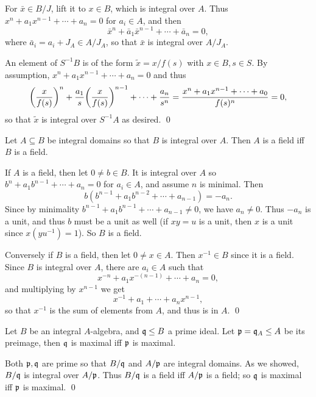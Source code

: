 \eprop

\bproof

    For $\bar x\in B/J$, lift it to $x\in B$, which is integral over $A$.
    Thus $x^n+a_1x^{n-1}+\cdots+a_n=0$ for $a_i\in A$, and then
    $$ \bar x^n + \bar a_1\bar x^{n-1} + \cdots + \bar a_n = 0 , $$
    where $\bar a_i=a_i+J_A\in A/J_A$, so that $\bar x$ is integral over $A/J_A$.

    An element of $S^{-1}B$ is of the form $\tilde x=x/f(s)$ with $x\in B,s\in S$.
    By assumption, $x^n+a_1x^{n-1}+\cdots+a_n=0$ and thus
    $$ \mathopen{}\mathclose{\left({{x}\over{f(s)}}\right)}^n + {{a_1}\over{s}}\mathopen{}\mathclose{\left({{x}\over{f(s)}}\right)}^{n-1} + \cdots + {{a_n}\over{s^n}} = {{x^n+a_1x^{n-1}+\cdots+a_0}\over{f(s)^n}} = 0 , $$
    so that $\tilde x$ is integral over $S^{-1}A$ as desired.
    \qed

\eproof

\bprop

    Let $A\subseteq B$ be integral domains so that $B$ is integral over $A$.
    Then $A$ is a field iff $B$ is a field.

\eprop

\bproof

    If $A$ is a field, then let $0\neq b\in B$.
    It is integral over $A$ so $b^n+a_1b^{n-1}+\cdots+a_n=0$ for $a_i\in A$, and assume $n$ is minimal.
    Then
    $$ b(b^{n-1} + a_1b^{n-2} + \cdots + a_{n-1}) = -a_n . $$
    Since by minimality $b^{n-1}+a_1b^{n-1}+\cdots+a_{n-1}\neq0$, we have $a_n\neq0$.
    Thus $-a_n$ is a unit, and thus $b$ must be a unit as well (if $xy=u$ is a unit, then $x$ is a unit since $x(yu^{-1})=1$).
    So $B$ is a field.

    Conversely if $B$ is a field, then let $0\neq x\in A$.
    Then $x^{-1}\in B$ since it is a field.
    Since $B$ is integral over $A$, there are $a_i\in A$ such that
    $$ x^{-n} + a_1x^{-(n-1)} + \cdots + a_n = 0 , $$
    and multiplying by $x^{n-1}$ we get
    $$ x^{-1} + a_1 + \cdots + a_nx^{n-1} , $$
    so that $x^{-1}$ is the sum of elements from $A$, and thus is in $A$.
    \qed

\eproof

\bcoro

    Let $B$ be an integral $A$-algebra, and ${{\frak q}}\leq B$ a prime ideal.
    Let ${{\frak p}}={{\frak q}}_A\leq A$ be its preimage, then ${{\frak q}}$ is maximal iff ${{\frak p}}$ is maximal.

\ecoro

\bproof

    Both ${{\frak p}},{{\frak q}}$ are prime so that $B/{{\frak q}}$ and $A/{{\frak p}}$ are integral domains.
    As we showed, $B/{{\frak q}}$ is integral over $A/{{\frak p}}$.
    Thus $B/{{\frak q}}$ is a field iff $A/{{\frak p}}$ is a field; so ${{\frak q}}$ is maximal iff ${{\frak p}}$ is maximal.
    \qed

